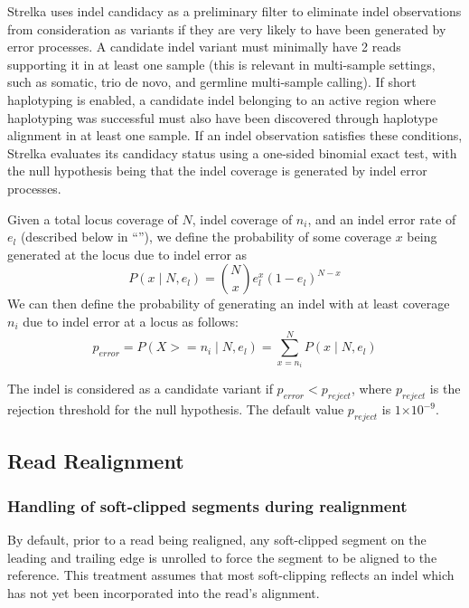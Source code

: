 \documentclass{article}
\newcommand{\e}[1]{\ensuremath{\times 10^{#1}}}
\begin{document}
Strelka uses indel candidacy as a preliminary filter to eliminate indel observations from consideration as variants if they are very likely to have been generated by error processes.  A candidate indel variant must minimally have 2 reads supporting it in at least one sample (this is relevant in multi-sample settings, such as somatic, trio de novo, and germline multi-sample calling). If short haplotyping is enabled, a candidate indel belonging to an active region where haplotyping was successful must also have been discovered through haplotype alignment in at least one sample. If an indel observation satisfies these conditions, Strelka evaluates its candidacy status using a one-sided binomial exact test, with the null hypothesis being that the indel coverage is generated by indel error processes.

Given a total locus coverage of $N$, indel coverage of $n_i$, and an indel error rate of $e_l$ (described below in ``''), we define the probability of some coverage $x$ being generated at the locus due to indel error as
\begin{equation*}
P(x \mid N, e_l) = \binom {N} {x} e^{x}_l (1 - e_l)^{N - x}
\end{equation*}
We can then define the probability of generating an indel with at least coverage $n_i$ due to indel error at a locus as follows:
\begin{equation*}
p_{error} = P(X >= n_i \mid N, e_l) = \sum_{x = n_i}^{N} P(x \mid N, e_l)
\end{equation*}

\noindent The indel is considered as a candidate variant if $p_{error} < p_{reject}$, where $p_{reject}$ is the rejection threshold for the null hypothesis. The default value $p_{reject}$ is $1\e{-9}$.


\subsection{Read Realignment}

\subsubsection{Handling of soft-clipped segments during realignment}

By default, prior to a read being realigned, any soft-clipped segment on the leading and trailing edge is unrolled to force the segment to be aligned to the reference. This treatment assumes that most soft-clipping reflects an indel which has not yet been incorporated into the read's alignment.
\end{document}

